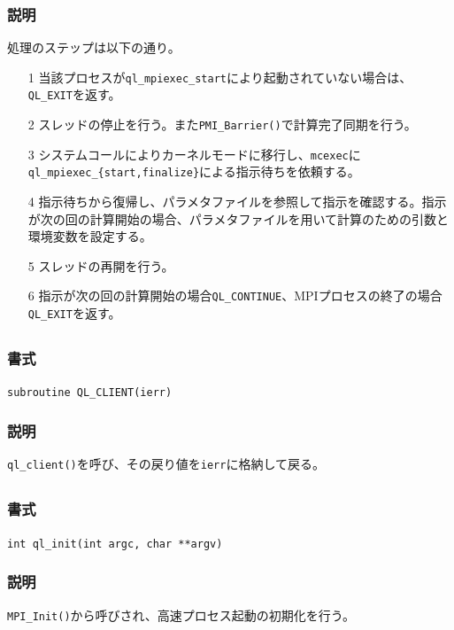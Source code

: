 \documentclass[twoside,11pt,fleqn]{book}
\begin{document}
\subsubsection*{説明}{\quad}
処理のステップは以下の通り。
\begin{itemize}
\item[1]当該プロセスが\texttt{ql\_mpiexec\_start}により起動されていない場合は、\texttt{QL\_EXIT}を返す。
\item[2]スレッドの停止を行う。また\texttt{PMI\_Barrier()}で計算完了同期を行う。
\item[3]
システムコールによりカーネルモードに移行し、\texttt{mcexec}に
\texttt{ql\_mpiexec\_\{start,finalize\}}による指示待ちを依頼する。
\item[4]指示待ちから復帰し、パラメタファイルを参照して指示を確認する。指示が次の回の計算開始の場合、パラメタファイルを用いて計算のための引数と環境変数を設定する。
\item[5] スレッドの再開を行う。
\item[6] 指示が次の回の計算開始の場合\texttt{QL\_CONTINUE}、MPIプロセスの終了の場合\texttt{QL\_EXIT}を返す。
\end{itemize}

\subsection{}
\subsubsection*{書式}{\quad} \texttt{subroutine QL\_CLIENT(ierr)}
\subsubsection*{説明}
\texttt{ql\_client()}を呼び、その戻り値を\texttt{ierr}に格納して戻る。

\subsection{}
\subsubsection*{書式}{\quad} \texttt{int ql\_init(int argc, char **argv)}
\subsubsection*{説明}{\quad}
\texttt{MPI\_Init()}から呼びされ、高速プロセス起動の初期化を行う。
\end{document}
